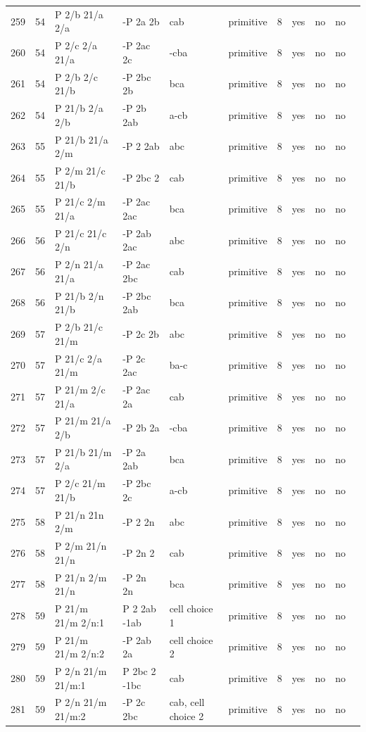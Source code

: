 \begin{center}
\begin{small}
\begin{longtable}{|l|l|l|l|l|l|l|l|l|l|l|}
259 &54 &P 2/b 21/a 2/a &-P 2a 2b &cab &primitive &8 &yes &no &no \\ 
260 &54 &P 2/c 2/a 21/a &-P 2ac 2c &-cba &primitive &8 &yes &no &no \\ 
261 &54 &P 2/b 2/c 21/b &-P 2bc 2b &bca &primitive &8 &yes &no &no \\ 
262 &54 &P 21/b 2/a 2/b &-P 2b 2ab &a-cb &primitive &8 &yes &no &no \\ 
263 &55 &P 21/b 21/a 2/m &-P 2 2ab &abc &primitive &8 &yes &no &no \\ 
264 &55 &P 2/m 21/c 21/b &-P 2bc 2 &cab &primitive &8 &yes &no &no \\ 
265 &55 &P 21/c 2/m 21/a &-P 2ac 2ac &bca &primitive &8 &yes &no &no \\ 
266 &56 &P 21/c 21/c 2/n &-P 2ab 2ac &abc &primitive &8 &yes &no &no \\ 
267 &56 &P 2/n 21/a 21/a &-P 2ac 2bc &cab &primitive &8 &yes &no &no \\ 
268 &56 &P 21/b 2/n 21/b &-P 2bc 2ab &bca &primitive &8 &yes &no &no \\ 
269 &57 &P 2/b 21/c 21/m &-P 2c 2b &abc &primitive &8 &yes &no &no \\ 
270 &57 &P 21/c 2/a 21/m &-P 2c 2ac &ba-c &primitive &8 &yes &no &no \\ 
271 &57 &P 21/m 2/c 21/a &-P 2ac 2a &cab &primitive &8 &yes &no &no \\ 
272 &57 &P 21/m 21/a 2/b &-P 2b 2a &-cba &primitive &8 &yes &no &no \\ 
273 &57 &P 21/b 21/m 2/a &-P 2a 2ab &bca &primitive &8 &yes &no &no \\ 
274 &57 &P 2/c 21/m 21/b &-P 2bc 2c &a-cb &primitive &8 &yes &no &no \\ 
275 &58 &P 21/n 21n 2/m &-P 2 2n &abc &primitive &8 &yes &no &no \\ 
276 &58 &P 2/m 21/n 21/n &-P 2n 2 &cab &primitive &8 &yes &no &no \\ 
277 &58 &P 21/n 2/m 21/n &-P 2n 2n &bca &primitive &8 &yes &no &no \\ 
278 &59 &P 21/m 21/m 2/n:1 &P 2 2ab -1ab &cell choice 1 &primitive &8 &yes &no &no \\ 
279 &59 &P 21/m 21/m 2/n:2 &-P 2ab 2a &cell choice 2 &primitive &8 &yes &no &no \\ 
280 &59 &P 2/n 21/m 21/m:1 &P 2bc 2 -1bc &cab &primitive &8 &yes &no &no \\ 
281 &59 &P 2/n 21/m 21/m:2 &-P 2c 2bc &cab, cell choice 2 &primitive &8 &yes &no &no \\ 

\end{longtable}
\end{small}
\end{center}

